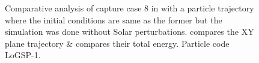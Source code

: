 \begin{figure}[htb]
\caption{Comparative analysis of capture case 8 in  with a particle trajectory where the initial conditions are same as the former but the simulation was done without Solar perturbations.  compares the XY plane trajectory \&  compares their total energy. Particle code LoGSP-1.}
\label{fig:LoGSP_1_capture_case_8_comparative analysis_trajectory_and_energy}
\end{figure}
\FloatBarrier

